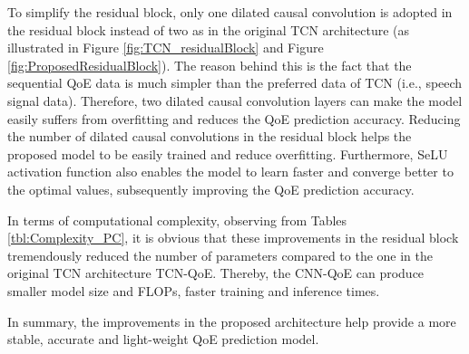 To simplify the residual block, only one dilated causal convolution is adopted in the residual block instead of two as in the original TCN architecture (as illustrated in Figure \ref{fig:TCN_residualBlock} and Figure \ref{fig:ProposedResidualBlock}).
The reason behind this is the fact that the sequential QoE data is much simpler than the preferred data of TCN \cite{Network_TCN} (i.e., speech signal data).
Therefore, two dilated causal convolution layers can make the model easily suffers from overfitting and reduces the QoE prediction accuracy.
Reducing the number of dilated causal convolutions in the residual block helps the proposed model to be easily trained and reduce overfitting.
Furthermore, SeLU \cite{SeLU} activation function also enables the model to learn faster and converge better to the optimal values, subsequently improving the QoE prediction accuracy.

In terms of computational complexity, observing from Tables \ref{tbl:Complexity_PC}, it is obvious that these improvements in the residual block tremendously reduced the number of parameters compared to the one in the original TCN architecture TCN-QoE.
Thereby, the CNN-QoE can produce smaller model size and FLOPs, faster training and inference times.

In summary, the improvements in the proposed architecture help provide a more stable, accurate and light-weight QoE prediction model.